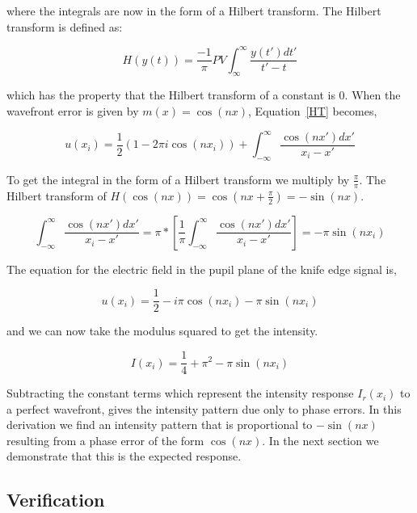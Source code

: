 where the integrals are now in the form of a Hilbert transform.\cite{villa2014foucault} The Hilbert transform is defined as:

\begin{equation}
    H(y(t))=\frac{-1}{\pi} PV\int_{\infty}^{\infty} \frac{y(t') dt'}{t'-t}
\end{equation}

which has the property that the Hilbert transform of a constant is 0.\cite{poularikas2018handbook} When the wavefront error is given by $m(x)=\cos(nx)$, Equation~\ref{HT} becomes, 


\begin{equation}
    u(x_i)= \frac{1}{2}(1-2\pi i \cos(nx_i))+\int_{-\infty}^\infty \frac{ \cos(nx')dx'}{x_i-x'}
\end{equation}

To get the integral in the form of a Hilbert transform we multiply by $\frac{\pi}{\pi}$. The Hilbert transform of $H(\cos(nx))=\cos(nx+\frac{\pi}{2})=-\sin(nx)$.

\begin{equation}
\int_{-\infty}^\infty \frac{ \cos(nx')dx'}{x_i-x'}=\pi*[\frac{1}{\pi}\int_{-\infty}^\infty \frac{ \cos(nx')dx'}{x_i-x'}]=-\pi \sin(nx_i)
\end{equation}

The equation for the electric field in the pupil plane of the knife edge signal is,

\begin{equation}
   u(x_i)= \frac{1}{2}-i \pi \cos(nx_i) -\pi \sin(nx_i)
   \label{derivationResult}
\end{equation}

and we can now take the modulus squared to get the intensity.

\begin{equation}
    I(x_i)=\frac{1}{4}+\pi^2-\pi \sin(nx_i)
    \label{equationIntensityResult}
\end{equation}

Subtracting the constant terms which represent the intensity response $I_r (x_i )$ to a perfect wavefront, gives the intensity pattern due only to phase errors. In this derivation we find an intensity pattern that is proportional to $-\sin(nx)$ resulting from a phase error of the form $\cos(nx)$. In the next section we demonstrate that this is the expected response.

\subsection{Verification}

